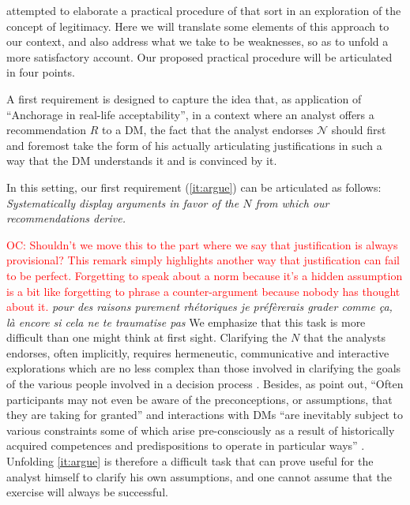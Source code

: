\documentclass[preprint, french, english, 11pt, authoryear]{elsarticle}%
\newcommand{\commentOC}[1]{\textcolor{red}{OC: #1}}
\newcommand{\adv}{\mathscr{N}}
\begin{document}
\citet{meinard_what_2017} attempted to elaborate a practical procedure of that sort in an exploration of the concept of legitimacy. Here we will translate some elements of this approach to our context, and also address what we take to be weaknesses, so as to unfold a more satisfactory account. 
Our proposed practical procedure will be articulated in four points.

\begin{changebar}
A first requirement is designed to capture the idea that, as application of “Anchorage in real-life acceptability”, in a context where an analyst offers a recommendation $R$ to a \ac{DM}, 
the fact that the analyst endorses $\adv$ should first and foremost take the form of his actually articulating justifications in such a way that the \ac{DM} understands it and is convinced by it.
\end{changebar}

In this setting, our first requirement (\cref{it:argue}) can be articulated as follows: \emph{Systematically display arguments in favor of the $N$ from which our recommendations derive.}

\begin{changebar}\commentOC{Shouldn’t we move this to the part where we say that justification is always provisional? This remark simply highlights another way that justification can fail to be perfect. 
Forgetting to speak about a norm because it’s a hidden assumption is a bit like forgetting to phrase a counter-argument because nobody has thought about it.} 
\emph{pour des raisons purement rhétoriques je préfèrerais grader comme ça, là encore si cela ne te traumatise pas}
We emphasize that this task is more difficult than one might think at first sight.
Clarifying the $N$ that the analysts endorses, often implicitly, requires hermeneutic, communicative and interactive explorations which are no less complex than those involved in clarifying the goals of the various people involved in a decision process \citep{reisach_creation_2016}.
Besides, as \citet{cronin_issues_2014} point out, ``Often participants may not even be aware of the preconceptions, or assumptions, that they are taking for granted'' and interactions with \acp{DM} 
``are inevitably subject to various constraints some of which arise pre-consciously as a result of historically acquired competences and predispositions to operate in particular ways'' \citep{brocklesby_ethics_2009}.
Unfolding \cref{it:argue} is therefore a difficult task that can prove useful for the analyst himself to clarify his own assumptions, and one cannot assume that the exercise will always be successful.\end{changebar}
\end{document}
